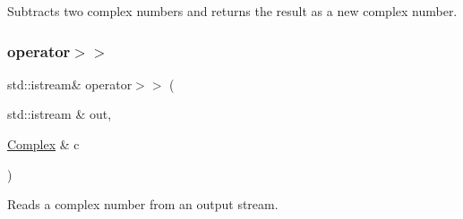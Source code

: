 Subtracts two complex numbers and returns the result as a new complex number. 

\mbox{\label{classComplex_a4c3792c8f6bd0778d0607c3a161e9eb6}} 
\subsubsection{\texorpdfstring{operator$>$$>$}{operator>>}}
{\footnotesize\ttfamily std\+::istream\& operator$>$$>$ (\begin{DoxyParamCaption}\item[{std\+::istream \&}]{out,  }\item[{\mbox{\hyperlink{classComplex}{Complex}} \&}]{c }\end{DoxyParamCaption})\hspace{0.3cm}{\ttfamily [friend]}}



Reads a complex number from an output stream. 

